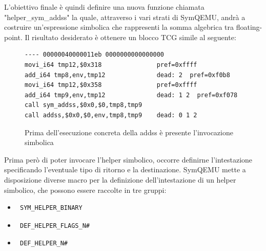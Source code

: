 \documentclass[Lau, oneside]{sapthesis}%
\begin{document}
\newline \newline
L'obiettivo finale è quindi definire una nuova funzione chiamata "helper\_sym\_addss" la quale, attraverso i vari strati di SymQEMU, andrà a costruire un'espressione simbolica che rappresenti la somma algebrica tra floating-point.
\newline \newline
Il risultato desiderato è ottenere un blocco TCG simile al seguente:
\begin{figure}[h]
\begin{lstlisting}[xleftmargin=0\textwidth, language=SymQEMU]
---- 00000040000011eb 0000000000000000
movi_i64 tmp12,$0x318               pref=0xffff
add_i64 tmp8,env,tmp12              dead: 2  pref=0xf0b8
movi_i64 tmp12,$0x358               pref=0xffff
add_i64 tmp9,env,tmp12              dead: 1 2  pref=0xf078
call sym_addss,$0x0,$0,tmp8,tmp9       
call addss,$0x0,$0,env,tmp8,tmp9    dead: 0 1 2
\end{lstlisting}
    \caption{Prima dell'esecuzione concreta della addss è presente l'invocazione simbolica}
    \label{fig:addss_dopo}
\end{figure}




\newpage
Prima però di poter invocare l'helper simbolico, occorre definirne l'intestazione specificando l'eventuale tipo di ritorno e la destinazione.
\newline \newline
SymQEMU mette a disposizione diverse macro per la definizione dell'intestazione di un helper simbolico, che possono essere raccolte in tre gruppi:
\begin{itemize}
    \item \begin{verbatim} SYM_HELPER_BINARY \end{verbatim}
    \item \begin{verbatim} DEF_HELPER_FLAGS_N# \end{verbatim}
    \item \begin{verbatim} DEF_HELPER_N# \end{verbatim}
\end{itemize}
\end{document}

